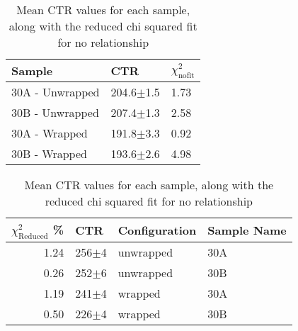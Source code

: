 \begin{table}
\label{tab:doiresults}
\caption{Mean CTR values for each sample, along with the reduced chi squared fit for no relationship}
\begin{tabular}{lll}
\hline
Sample &            CTR &   $\chi^2_\text{nofit}$ \\
\hline
   30A - Unwrapped &  204.6$\pm$1.5 &  1.73 \\
   30B - Unwrapped &  207.4$\pm$1.3 &  2.58 \\
   30A - Wrapped &  191.8$\pm$3.3 &  0.92 \\
   30B - Wrapped &  193.6$\pm$2.6 &  4.98 \\
\hline
\end{tabular}
\end{table}

\begin{table}
\label{tab:doiresults}
\caption{Mean CTR values for each sample, along with the reduced chi squared fit for no relationship}
\begin{tabular}{rlll}
\hline
 $\chi^2_\text{Reduced}$ \% &        CTR & Configuration & Sample Name \\
\hline
                   1.24 &  256$\pm$4 &     unwrapped &         30A \\
                   0.26 &  252$\pm$6 &     unwrapped &         30B \\
                   1.19 &  241$\pm$4 &       wrapped &         30A \\
                   0.50 &  226$\pm$4 &       wrapped &         30B \\
\hline
\end{tabular}
\end{table}